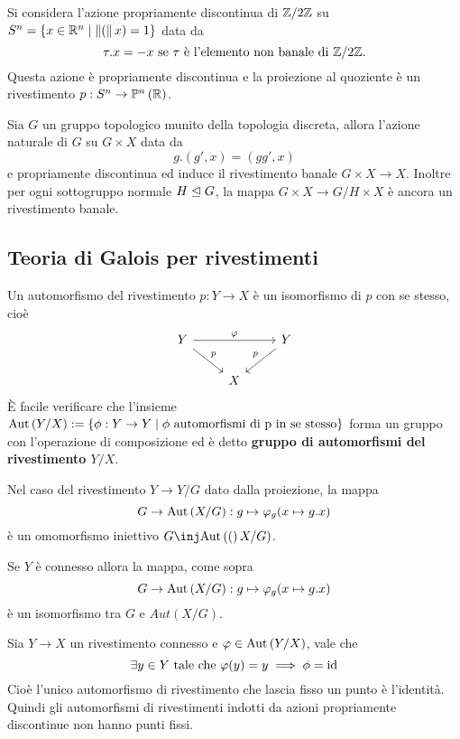 \documentclass[]{article}
\begin{document}
\begin{example}  \nl
    Si considera l'azione propriamente discontinua di $\mathbb{Z} / 2\mathbb{Z}$ su $S^{n} = \left\{ x \in \mathbb{R}^n \mid \left\| ( \right\|x) = 1 \right\}$ data da
    \[
        \tau.x = -x \text{ se } \tau \text{ \`e l'elemento non banale di } \mathbb{Z} / 2\mathbb{Z}.
    \]
    Questa azione \`e propriamente discontinua e la proiezione al quoziente \`e un rivestimento $p: S^{n} \to \mathbb{P}^{n}\left(\mathbb{R}\right)$.
\end{example}

\begin{example}  \nl
    Sia $G$ un gruppo topologico munito della topologia discreta, allora l'azione naturale di $G$ su $G \times X$
    data da 
    \[
        g.\left(g',x\right) = \left(gg', x\right)
    \]
    e propriamente discontinua ed induce il rivestimento banale $G \times X \to X$. \nl
    Inoltre per ogni sottogruppo normale $H \trianglelefteq G$, la mappa $G \times X \to G/H \times X$ \`e ancora
    un rivestimento banale.
\end{example}

\subsection{Teoria di Galois per rivestimenti}

\begin{definition}  \nl
    Un automorfismo del rivestimento $p: Y \to X$ \`e un isomorfismo di $p$ con se stesso, cio\`e
    \[\begin{tikzcd}
	{Y} && {Y} \\
	& X
	\arrow["\varphi", from=1-1, to=1-3]
	\arrow["{p}", from=1-1, to=2-2]
	\arrow["{p}"', from=1-3, to=2-2]
    \end{tikzcd}\]
    \`E facile verificare che l'insieme $\mathrm{Aut}\left(Y/X\right) := \left\{ \phi: Y \to Y \mid \phi \text{ automorfismi di p in se stesso} \right\}$
    forma un gruppo con l'operazione di composizione ed \`e detto \textbf{gruppo di automorfismi del rivestimento $Y/X$}.
\end{definition}

\begin{remark} \nl
    Nel caso del rivestimento $Y \to Y/G$ dato dalla proiezione, la mappa 
    \[
        G \to \mathrm{Aut}\left(X/G\right): g \mapsto \varphi_g(x \mapsto g.x)
    \]
    \`e un omomorfismo iniettivo $G \inj \Aut(X/G)$.
\end{remark}

\begin{proposition} \nl
    Se $Y$ \`e connesso allora la mappa, come sopra
    \[
        G \to \mathrm{Aut}\left(X/G\right): g \mapsto \varphi_g(x \mapsto g.x)
    \]
    \`e un isomorfismo tra $G$ e $Aut(X/G)$.
\end{proposition}

\begin{lemma} \nl
    Sia $Y \to X$ un rivestimento connesso e $\varphi \in \mathrm{Aut}\left(Y/X\right)$, vale che
    \[
    \exists y \in Y \text{ tale che } \varphi(y) = y \implies \phi = \mathrm{id}
    \]
    Cio\`e l'unico automorfismo di rivestimento che lascia fisso un punto \`e l'identit\`a. \nl
    Quindi gli automorfismi di rivestimenti indotti da azioni propriamente discontinue non hanno punti fissi.
\end{lemma}

\
\end{document}
